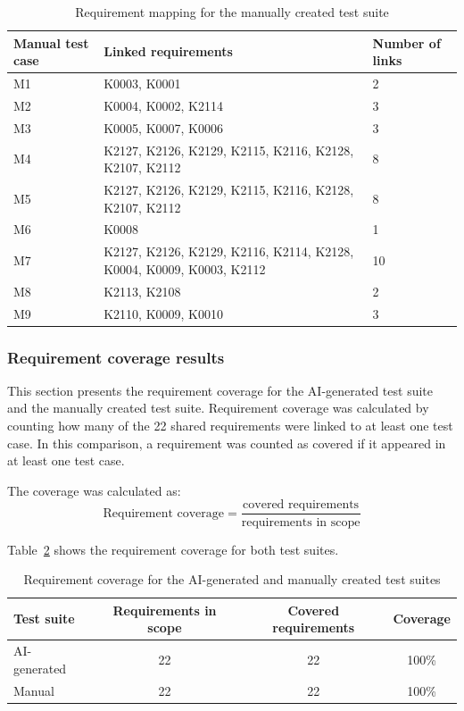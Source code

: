 \documentclass[a4paper,12pt]{article}
\begin{document}
\begin{table}[H]
\centering
\caption{Requirement mapping for the manually created test suite}
\label{tab:manual_requirement_mapping}
\begin{tabular}{p{2.5cm} p{9cm} p{2cm}}
\toprule
\textbf{Manual test case} & \textbf{Linked requirements} & \textbf{Number of links} \\
\midrule
M1 & K0003, K0001 & 2 \\
M2 & K0004, K0002, K2114 & 3 \\
M3 & K0005, K0007, K0006 & 3 \\
M4 & K2127, K2126, K2129, K2115, K2116, K2128, K2107, K2112 & 8 \\
M5 & K2127, K2126, K2129, K2115, K2116, K2128, K2107, K2112 & 8 \\
M6 & K0008 & 1 \\
M7 & K2127, K2126, K2129, K2116, K2114, K2128, K0004, K0009, K0003, K2112 & 10 \\
M8 & K2113, K2108 & 2 \\
M9 & K2110, K0009, K0010 & 3 \\
\bottomrule
\end{tabular}
\end{table}

\subsubsection{Requirement coverage results}
This section presents the requirement coverage for the AI-generated test suite and the manually created test suite. Requirement coverage was calculated by counting how many of the 22 shared requirements were linked to at least one test case. In this comparison, a requirement was counted as covered if it appeared in at least one test case.

The coverage was calculated as:
\[
\text{Requirement coverage} = \frac{\text{covered requirements}}{\text{requirements in scope}}
\]

Table~\ref{tab:requirement_coverage} shows the requirement coverage for both test suites.

\begin{table}[H]
\centering
\caption{Requirement coverage for the AI-generated and manually created test suites}
\label{tab:requirement_coverage}
\begin{tabular}{lccc}
\toprule
\textbf{Test suite} & \textbf{Requirements in scope} & \textbf{Covered requirements} & \textbf{Coverage} \\
\midrule
AI-generated & 22 & 22 & 100\% \\
Manual & 22 & 22 & 100\% \\
\bottomrule
\end{tabular}
\end{table}
\end{document}
